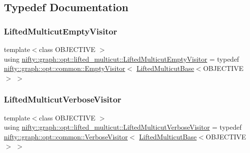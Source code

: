 \subsection{Typedef Documentation}
\mbox{\label{namespacenifty_1_1graph_1_1opt_1_1lifted__multicut_a5004a60975a330999c409f23ae3b74e9}} 
\subsubsection{\texorpdfstring{Lifted\+Multicut\+Empty\+Visitor}{LiftedMulticutEmptyVisitor}}
{\footnotesize\ttfamily template$<$class O\+B\+J\+E\+C\+T\+I\+VE $>$ \\
using \hyperlink{namespacenifty_1_1graph_1_1opt_1_1lifted__multicut_a5004a60975a330999c409f23ae3b74e9}{nifty\+::graph\+::opt\+::lifted\+\_\+multicut\+::\+Lifted\+Multicut\+Empty\+Visitor} = typedef \hyperlink{classnifty_1_1graph_1_1opt_1_1common_1_1EmptyVisitor}{nifty\+::graph\+::opt\+::common\+::\+Empty\+Visitor}$<$ \hyperlink{classnifty_1_1graph_1_1opt_1_1lifted__multicut_1_1LiftedMulticutBase}{Lifted\+Multicut\+Base}$<$O\+B\+J\+E\+C\+T\+I\+VE$>$ $>$}

\mbox{\label{namespacenifty_1_1graph_1_1opt_1_1lifted__multicut_a820671dadb730a13fd57f011e3c0f6ce}} 
\subsubsection{\texorpdfstring{Lifted\+Multicut\+Verbose\+Visitor}{LiftedMulticutVerboseVisitor}}
{\footnotesize\ttfamily template$<$class O\+B\+J\+E\+C\+T\+I\+VE $>$ \\
using \hyperlink{namespacenifty_1_1graph_1_1opt_1_1lifted__multicut_a820671dadb730a13fd57f011e3c0f6ce}{nifty\+::graph\+::opt\+::lifted\+\_\+multicut\+::\+Lifted\+Multicut\+Verbose\+Visitor} = typedef \hyperlink{classnifty_1_1graph_1_1opt_1_1common_1_1VerboseVisitor}{nifty\+::graph\+::opt\+::common\+::\+Verbose\+Visitor}$<$ \hyperlink{classnifty_1_1graph_1_1opt_1_1lifted__multicut_1_1LiftedMulticutBase}{Lifted\+Multicut\+Base}$<$O\+B\+J\+E\+C\+T\+I\+VE$>$ $>$}


